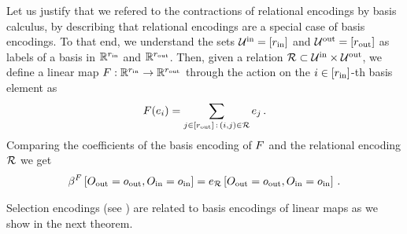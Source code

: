 \begin{example}
	Let us justify that we refered to the contractions of relational encodings by basis calculus, by describing that relational encodings are a special case of basis encodings.
	To that end, we understand the sets $\mathcal{U}^{\mathrm{in}}=[r_{\mathrm{in}}]$ and $\mathcal{U}^{\mathrm{out}}=[r_{\mathrm{out}}]$ as labels of a basis in $\mathbb{R}^{r_{\mathrm{in}}}$ and $\mathbb{R}^{r_{\mathrm{out}}}$.
	Then, given a relation $\mathcal{R} \subset \mathcal{U}^{\mathrm{in}} \times \mathcal{U}^{\mathrm{out}}$, we define a linear map $F : \mathbb{R}^{r_{\mathrm{in}}} \rightarrow \mathbb{R}^{r_{\mathrm{out}}}$ through the action on the $i\in[r_{\mathrm{in}}]$-th basis element as
	\begin{align*}
		F(e_{i}) = \sum_{j\in[r_{\mathrm{out}}]\, : \, (i,j) \in \mathcal{R}} e_{j} \, .
	\end{align*}
	Comparing the coefficients of the basis encoding of $F$ and the relational encoding $\mathcal{R}$ we get
	\begin{align*}
		\beta^{F}\left[O_{\mathrm{out}}=o_{\mathrm{out}},O_{\mathrm{in}}=o_{\mathrm{in}}\right]
		= e_{\mathcal{R}}\left[O_{\mathrm{out}}=o_{\mathrm{out}},O_{\mathrm{in}}=o_{\mathrm{in}}\right] \, .
	\end{align*}
\end{example}




Selection encodings (see ) are related to basis encodings of linear maps as we show in the next theorem.


